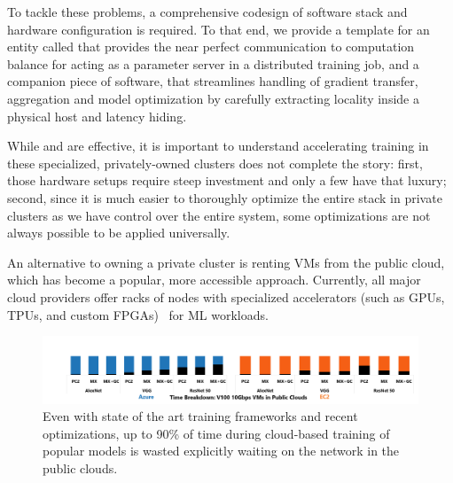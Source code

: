 To tackle these problems, a comprehensive codesign of software stack and hardware configuration is required. To that end, we provide a template for an entity called \pbox that provides the near perfect communication to computation balance for acting as a parameter server in a distributed training job, and a companion piece of software, \phub that streamlines handling of gradient transfer, aggregation and model optimization by carefully extracting locality inside a physical host and latency hiding. 

While \pbox and \phub are effective, it is important to understand accelerating training in these specialized, privately-owned clusters does not complete the story: first, those hardware setups require steep investment and only a few have that luxury; second, since it is much easier to thoroughly optimize the entire stack in private clusters as we have control over the entire system, some optimizations are not always possible to be applied universally.

An alternative to owning a private cluster is renting VMs from the public cloud, which has become a popular, more accessible approach. Currently, all major cloud providers offer racks of nodes with specialized accelerators (such as GPUs, TPUs, and custom FPGAs)~\cite{GoogleCl74:online,MachineL50:online,DeepLear23:online,sagemaker,brainwave,Jouppi:2017:IPA:3079856.3080246,222611} for ML workloads. %

\begin{figure}[t!]
	\centering
	\includegraphics[width=.9\linewidth, trim=6 1 3 3,clip]{Figures/cloudoverhead.png}
	\caption{Even with state of the art training frameworks and recent optimizations, up to 90\% of time during cloud-based training of popular models is wasted explicitly waiting on the network in the public clouds.}
	\label{fig:cloudOverhead}
\end{figure}

